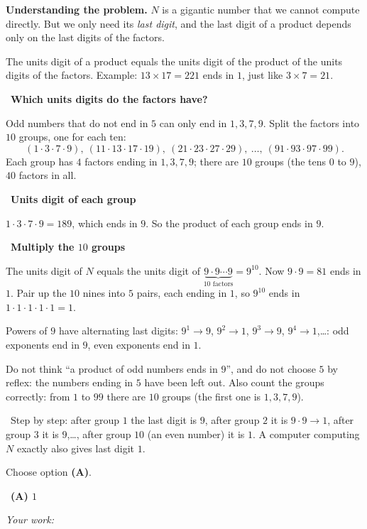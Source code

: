 \documentclass[11pt]{article}
\newif\ifsol \solfalse
\providecommand{\AnsWord}{Đáp số}
\newcommand{\StuProb}[2]{\begin{probboxS}{#1}{#2}\StuProbBody\end{probboxS}}
\newcommand{\ans}[1]{\par\smallskip{\bfseries\color{tmGreen!88!black}\AnsWord:}\ {\bfseries\color{AnsRed}#1}\par}
\newcommand{\probsol}[1]{%
  \begin{lrbox}{\solmeasure}\begin{minipage}{\dimexpr\linewidth-24pt\relax}#1\end{minipage}\end{lrbox}%
  \ifsol
    \begin{solbox}#1\end{solbox}%
  \else
    \setlength{\solht}{\dimexpr\ht\solmeasure+\dp\solmeasure+0.85cm\relax}%
    \ifdim\solht<1.35cm\setlength{\solht}{1.35cm}\fi
    \ifdim\solht>\StudentMaxWork\setlength{\solht}{\StudentMaxWork}\fi
    \par\noindent\begin{minipage}{\linewidth}%
    \expandafter\StuProb\StuProbArgs
    \begin{tcolorbox}[colback=white,colframe=Line,boxrule=0.8pt,arc=5pt,
      left=8pt,right=8pt,top=4pt,bottom=4pt,height=\solht]{\footnotesize\color{Slate}\itshape\WorkWord}\end{tcolorbox}%
    \end{minipage}\par\medskip
  \fi}
\newlength{\StudentMaxWork}\setlength{\StudentMaxWork}{4.5cm}
\newcommand{\step}[2]{\par\smallskip\noindent{\bfseries\color{tmBlue!85!black}\StepWord~#1.}\ {\bfseries #2}\par\nopagebreak}
\newcommand{\verify}[1]{\par\smallskip\noindent{\bfseries\color{tmGreen!80!black}\faCheckCircle\ \CheckWord}\ #1\par}
\def\WorkWord{Your work:}
\def\AnsWord{Answer}
\def\StepWord{Step}
\def\CheckWord{Check:}
\begin{document}
\probsol{
\textbf{Understanding the problem.} $N$ is a gigantic number that we cannot compute directly. But we only need its \emph{last digit}, and the last digit of a product depends only on the last digits of the factors.

\begin{recallbox}The units digit of a product equals the units digit of the product of the units digits of the factors. Example: $13\times 17=221$ ends in $1$, just like $3\times 7=21$.\end{recallbox}

\step{1}{Which units digits do the factors have?}
Odd numbers that do not end in $5$ can only end in $1,3,7,9$. Split the factors into $10$ groups, one for each ten:
\[(1\cdot3\cdot7\cdot9),\ (11\cdot13\cdot17\cdot19),\ (21\cdot23\cdot27\cdot29),\ \dots,\ (91\cdot93\cdot97\cdot99).\]
Each group has $4$ factors ending in $1,3,7,9$; there are $10$ groups (the tens $0$ to $9$), $40$ factors in all.

\step{2}{Units digit of each group}
$1\cdot3\cdot7\cdot9=189$, which ends in $9$. So the product of each group ends in $9$.

\step{3}{Multiply the $10$ groups}
The units digit of $N$ equals the units digit of $\underbrace{9\cdot 9\cdots 9}_{10\text{ factors}}=9^{10}$. Now $9\cdot 9=81$ ends in $1$. Pair up the $10$ nines into $5$ pairs, each ending in $1$, so $9^{10}$ ends in $1\cdot1\cdot1\cdot1\cdot1=1$.

\begin{tipbox}Powers of $9$ have alternating last digits: $9^1\to 9$, $9^2\to 1$, $9^3\to 9$, $9^4\to 1$,\dots: odd exponents end in $9$, even exponents end in $1$.\end{tipbox}

\begin{warnbox}Do not think ``a product of odd numbers ends in $9$'', and do not choose $5$ by reflex: the numbers ending in $5$ have been left out. Also count the groups correctly: from $1$ to $99$ there are $10$ groups (the first one is $1,3,7,9$).\end{warnbox}

\verify{Step by step: after group $1$ the last digit is $9$, after group $2$ it is $9\cdot9\to1$, after group $3$ it is $9$,\dots, after group $10$ (an even number) it is $1$. A computer computing $N$ exactly also gives last digit $1$.}
Choose option \textbf{(A)}.
\ans{(A) $1$}
}
\end{document}

